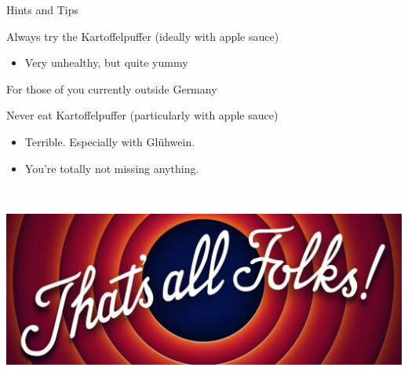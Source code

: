 \documentclass{hertieteaching}
\begin{document}
\begin{frame}{Hints and Tips}

Always try the Kartoffelpuffer (ideally with apple sauce)
\begin{itemize}
  \item Very unhealthy, but quite yummy
\end{itemize}

\bigskip
\pause
For those of you currently outside Germany


Never eat Kartoffelpuffer (particularly with apple sauce)
\begin{itemize}
  \item Terrible. Especially with Glühwein. 
  \item You're totally not missing anything.
\end{itemize}

\end{frame}

\begin{frame}{~~}

\bigskip
\centerline{\includegraphics[scale=0.4]{pictures/thatsallfolks}}

\end{frame}


\end{document}
